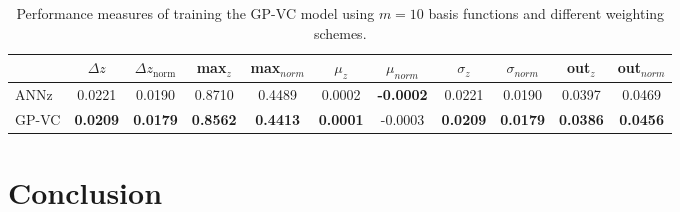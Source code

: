 \documentclass[useAMS,usenatbib,fleqn]{mn2e}
\begin{document}
 \begin{table}
\caption{Performance measures of training the GP-VC model using $m=10$ basis functions and different weighting schemes.}
\begin{center}
\begin{tabular}{| l | c | c |  c | c |  c | c |  c | c |  c | c | }
     				&	$\Delta z$	&	$\Delta z_\textrm{norm}$	&	max$_{z}$ & max$_{norm}$		&	$\mu_{z}$&	$\mu_{norm}$	& $\sigma_{z}$ & $\sigma_{norm}$ & out$_{z}$&out$_{norm}$\\	\hline
	{\sc ANNz}		&	0.0221	&	0.0190		&	0.8710		&	0.4489&	0.0002		&	\textbf{-0.0002}&	0.0221		&	0.0190&	0.0397		&	0.0469\\
	{\sc GP-VC } 	&	\textbf{0.0209} 	&	\textbf{0.0179}		&	\textbf{0.8562}	&	\textbf{0.4413} & \textbf{0.0001}		&	-0.0003&	\textbf{0.0209}		&	\textbf{0.0179}&	\textbf{0.0386} 	&	\textbf{0.0456}\\\hline
  \end{tabular}
\end{center}
\label{table-final-results}
\end{table}

\section{Conclusion}
\label{sec-conclusion}
\end{document}
